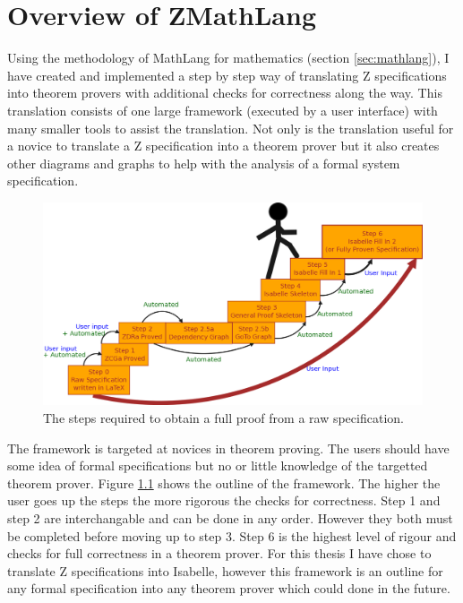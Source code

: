 
\chapter{Overview of ZMathLang}
\label{ch:design}

Using the methodology of MathLang for mathematics (section \ref{sec:mathlang}), I have created and implemented a step by step way of translating Z specifications into theorem provers with additional checks for correctness along the way. This translation consists of one large framework (executed by a user interface) with many smaller tools to assist the translation. Not only is the translation useful for a novice to translate a Z specification into a theorem prover but it also creates other diagrams and graphs to help with the analysis of a formal system specification.

\begin{figure}[H]
 \begin{center}
 \includegraphics [width=12cm]{Figures/Design/mathlangsteps.png}
 \caption{The steps required to obtain a full proof from a raw specification.}
 \label{fig:steps}
\end{center}
\end{figure} 

The framework is targeted at novices in theorem proving. The users should have some idea of formal specifications but no or little knowledge of the targetted theorem prover. Figure \ref{fig:steps} shows the outline of the framework. The higher the user goes up the steps the more rigorous the checks for correctness. Step 1 and step 2 are interchangable and can be done in any order. However they both must be completed before moving up to step 3. Step 6 is the highest level of rigour and checks for full correctness in a theorem prover. For this thesis I have chose to translate Z specifications into Isabelle, however this framework is an outline for any formal specification into any theorem prover which could done in the future.

